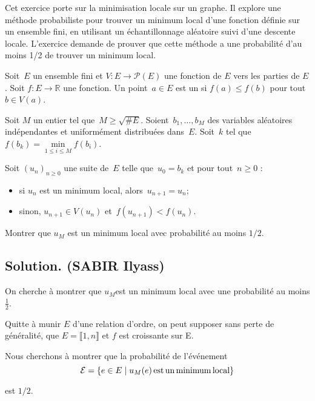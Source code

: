 Cet exercice porte sur la minimisation locale sur un graphe. Il explore une
m{\'e}thode probabiliste pour trouver un minimum local d'une fonction
d{\'e}finie sur un ensemble fini, en utilisant un {\'e}chantillonnage
al{\'e}atoire suivi d'une descente locale. L'exercice demande de prouver que
cette m{\'e}thode a une probabilit{\'e} d'au moins 1/2 de trouver un minimum
local.
\begin{exercise}
Soit~$E$ un ensemble fini et $V : E \to \mathcal{P} (E)$ une fonction de $E$
vers les parties de $E$. Soit $f : E \to \mathbb{R}$ une fonction. Un point~$a
\in E$ est un {} si $f (a) \leq f (b)$ pour tout $b \in V
(a)$.

Soit $M$ un entier tel que~$M \geq \sqrt{\#E}$. Soient~$b_1, \ldots, b_M$ des
variables al{\'e}atoires ind{\'e}pendantes et uniform{\'e}ment distribu{\'e}es
dans~$E$. Soit~$k$ tel que $f (b_k) = \underset{1 \leq i \leq M}{\min} f
(b_i)$.

Soit $(u_n)_{n \geq 0}$ une suite de~$E$ telle que~$u_0 = b_k$ et pour tout~$n
\geq 0$ :
\begin{itemize}
  \item si $u_n$ est un minimum local, alors~$u_{n + 1} = u_n$;
  
  \item sinon, $u_{n + 1} \in V (u_n)$ et~$f (u_{n + 1}) < f (u_n)$.
\end{itemize}

Montrer que $u_M$ est un minimum local avec probabilit{\'e} au moins $1 / 2$.
\end{exercise}

\subsection*{Solution. (SABIR Ilyass)}

On cherche {\`a} montrer que $u_M $est un minimum local avec une
probabilit{\'e} au moins $\frac{1}{2}$.

Quitte {\`a} munir $E$ d'une relation d'ordre, on peut supposer sans perte de
g{\'e}n{\'e}ralit{\'e}, que $E = \llbracket 1, n \rrbracket$ et $f$ est
croissante sur E.

Nous cherchons {\`a} montrer que la probabilit{\'e} de l'{\'e}v{\'e}nement
\[ \mathcal{E}= \{ e \in E \mid u_M (e) \operatorname{est} \operatorname{un} \operatorname{minimum}
   \operatorname{local} \} \]


est $1 / 2$.

